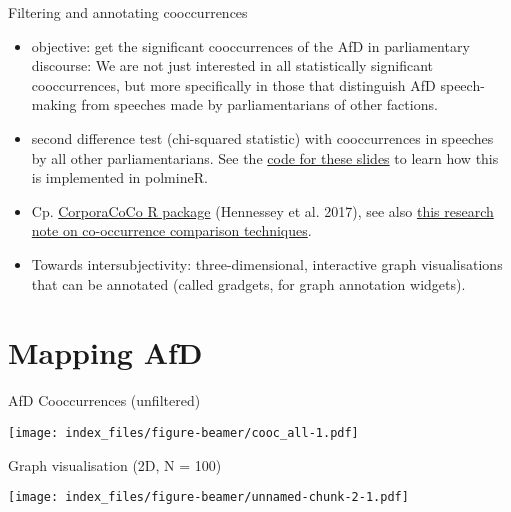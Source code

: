 \documentclass[
  ignorenonframetext,
]{beamer}
\begin{document}
\begin{frame}{Filtering and annotating cooccurrences}
\protect\hypertarget{filtering-and-annotating-cooccurrences}{}

\begin{itemize}
\item
  objective: get the significant cooccurrences of the AfD in
  parliamentary discourse: We are not just interested in all
  statistically significant cooccurrences, but more specifically in
  those that distinguish AfD speech-making from speeches made by
  parliamentarians of other factions.
\item
  second difference test (chi-squared statistic) with cooccurrences in
  speeches by all other parliamentarians. See the
  \href{https://github.com/PolMine/gcdh_slides}{code for these slides}
  to learn how this is implemented in polmineR.
\item
  Cp. \href{https://CRAN.R-project.org/package=CorporaCoCo}{CorporaCoCo
  R package} (Hennessey et al. 2017), see also
  \href{https://www.birmingham.ac.uk/Documents/college-artslaw/corpus/conference-archives/2017/general/paper362.pdf}{this
  research note on co-occurrence comparison techniques}.
\item
  Towards intersubjectivity: three-dimensional, interactive graph
  visualisations that can be annotated (called gradgets, for graph
  annotation widgets).
\end{itemize}

\end{frame}

\hypertarget{mapping-afd}{%
\section{Mapping AfD}\label{mapping-afd}}

\begin{frame}{AfD Cooccurrences (unfiltered)}
\protect\hypertarget{afd-cooccurrences-unfiltered}{}

\texttt{[image: index\_files/figure-beamer/cooc\_all-1.pdf]}

\end{frame}

\begin{frame}{Graph visualisation (2D, N = 100)}
\protect\hypertarget{graph-visualisation-2d-n-100}{}

\texttt{[image: index\_files/figure-beamer/unnamed-chunk-2-1.pdf]}

\end{frame}
\end{document}
